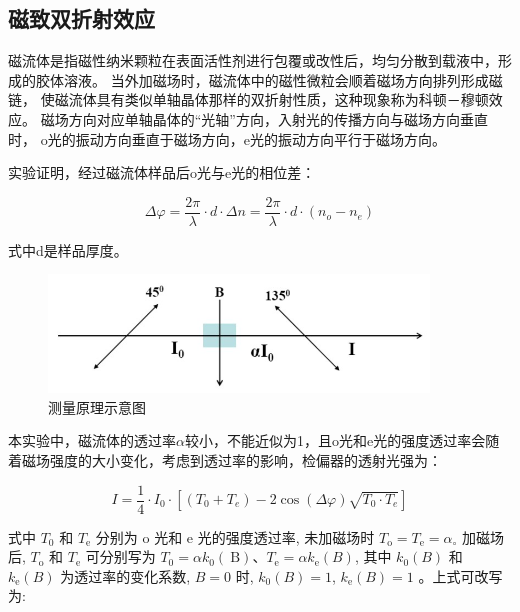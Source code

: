 \documentclass[a4paper,UTF8]{ctexart}
\begin{document}
\subsection{磁致双折射效应}

磁流体是指磁性纳米颗粒在表面活性剂进行包覆或改性后，均匀分散到载液中，形成的胶体溶液。
当外加磁场时，磁流体中的磁性微粒会顺着磁场方向排列形成磁链，
使磁流体具有类似单轴晶体那样的双折射性质，这种现象称为科顿－穆顿效应。
磁场方向对应单轴晶体的“光轴”方向，入射光的传播方向与磁场方向垂直时，
o光的振动方向垂直于磁场方向，e光的振动方向平行于磁场方向。

实验证明，经过磁流体样品后o光与e光的相位差：

\begin{equation}
\Delta \varphi=\frac{2 \pi}{\lambda} \cdot d \cdot \Delta n=\frac{2 \pi}{\lambda} \cdot d \cdot\left(n_o-n_e\right)
\end{equation}

式中d是样品厚度。

\begin{figure}[H]
    \centering
    \begin{minipage}[b]{0.9\textwidth}
        \centering
        \includegraphics[width=0.9\textwidth]{./fig6.jpg}
        \caption{测量原理示意图}
    \end{minipage}
\end{figure}

本实验中，磁流体的透过率$\alpha$较小，不能近似为1，且o光和e光的强度透过率会随着磁场强度的大小变化，考虑到透过率的影响，检偏器的透射光强为：

\begin{equation}
I=\frac{1}{4} \cdot I_0 \cdot\left[\left(T_0+T_e\right)-2 \cos (\Delta \varphi) \sqrt{T_0 \cdot T_e}\right]
\end{equation}

式中 $T_0$ 和 $T_{\mathrm{e}}$ 分别为 $\mathrm{o}$ 光和 $\mathrm{e}$ 光的强度透过率,
 未加磁场时 $T_{\mathrm{o}}=T_{\mathrm{e}}=\alpha_{\circ}$ 加磁场后, 
 $T_{\mathrm{o}}$ 和 $T_{\mathrm{e}}$ 可分别写为 $T_0=\alpha k_0(\mathrm{~B}) 
 、 T_{\mathrm{e}}=\alpha k_{\mathrm{e}}(B)$, 其中 $k_0(B)$ 和 $k_{\mathrm{e}}(B)$
  为透过率的变化系数, $B=0$ 时, $k_0(B)=1$, $k_{\mathrm{e}}(B)=1$ 。上式可改写为:
\end{document}
